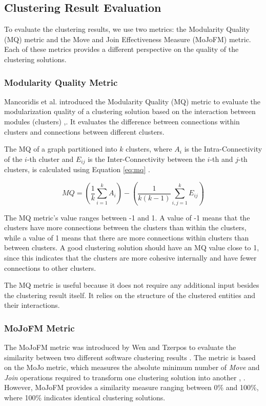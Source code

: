 \documentclass{ieeeaccess}
\begin{document}
\subsection{Clustering Result Evaluation}
\label{subsec:evaluation_def}

To evaluate the clustering results, we use two metrics: the Modularity Quality (MQ) metric and the Move and Join Effectiveness Measure (MoJoFM) metric. Each of these metrics provides a different perspective on the quality of the clustering solutions. 

\subsubsection{Modularity Quality Metric}
\label{subsec:mq}

Mancoridis et al. introduced the Modularity Quality (MQ) metric to evaluate the modularization quality of a clustering solution based on the interaction between modules (clusters) \cite{b101},\cite{b10}. It evaluates the difference between connections within clusters and connections between different clusters.

The MQ of a graph partitioned into \( k \) clusters, where \( A_i \) is the Intra-Connectivity of the \( i \)-th cluster and \( E_{ij} \) is the Inter-Connectivity between the \( i \)-th and \( j \)-th clusters, is calculated using Equation \eqref{eq:mq} \cite{b2}.

\begin{equation}
MQ = \left( \frac{1}{k} \sum_{i=1}^{k} A_i \right) - \left( \frac{1}{k(k-1)} \sum_{i,j=1}^{k} E_{ij} \right)
\label{eq:mq}
\end{equation}

The MQ metric's value ranges between -1 and 1. A value of -1 means that the clusters have more connections between the clusters than within the clusters, while a value of 1 means that there are more connections within clusters than between clusters. A good clustering solution should have an MQ value close to 1, since this indicates that the clusters are more cohesive internally and have fewer connections to other clusters.

The MQ metric is useful because it does not require any additional input besides the clustering result itself. It relies on the structure of the clustered entities and their interactions. 

\subsubsection{MoJoFM Metric}
The MoJoFM metric was introduced by Wen and Tzerpos to evaluate the similarity between two different software clustering results \cite{mojofm}. The metric is based on the MoJo metric, which measures the absolute minimum number of \textit{Move} and \textit{Join} operations required to transform one clustering solution into another \cite{b3}, \cite{b11}. However, MoJoFM provides a similarity measure ranging between 0\% and 100\%, where 100\% indicates identical clustering solutions.
\end{document}
